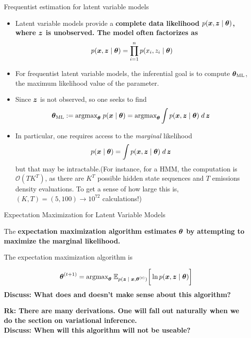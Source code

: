 \documentclass[10pt]{beamer}
\begin{document}
\begin{frame}{Frequentist estimation for latent variable models}
\footnotesize
\begin{itemize}
\item Latent variable models provide a \bf{complete data likelihood}  $p ({\boldsymbol x}, {\boldsymbol z} \; | \; {\boldsymbol \theta})$, where ${\boldsymbol z}$ is unobserved. The model often factorizes as
\[   p ({\boldsymbol x},  {\boldsymbol z} \; | \; {\boldsymbol \theta}) = \displaystyle\prod_{i=1}^n  p (x_i, z_i \; | \; {\boldsymbol \theta}) \]
\item For frequentist latent variable models, the inferential goal is to compute ${\boldsymbol \theta}_{\text{ML}}$, the maximum likelihood value of the parameter.  
\pause
\item Since ${\boldsymbol z}$ is not observed, so one seeks to find 
\begin{equation}
{\boldsymbol \theta}_{\text{ML}}:=  \text{argmax}_{{\boldsymbol \theta}} \; p ({\boldsymbol x} \; | \; {\boldsymbol \theta}) = \text{argmax}_{{\boldsymbol \theta}} \displaystyle\int p({\boldsymbol x},{\boldsymbol z} \; | \; {\boldsymbol \theta}) \; d \,{{\boldsymbol z}} \; 
\label{ml_latent_vars}
\end{equation}
\item In particular, one requires access to the \textit{marginal} likelihood
\begin{equation}
p({\boldsymbol x} \; | \; {\boldsymbol \theta}) = \displaystyle\int p({\boldsymbol x},{\boldsymbol z} \; | \; {\boldsymbol \theta}) \; d \,{{\boldsymbol z}} \; 
\label{marginal_likelihood}
\end{equation}
but that may be intractable.\pause \tiny (For instance, for a HMM, the computation is $\mathcal{O}(T K^T)$, as there are $K^T$ possible hidden state sequences and $T$ emissions density evaluations.  To get a sense of how large this is, $(K,T) = (5,100) \to  10^{72}$ calculations!)
\end{itemize}
\end{frame}






\begin{frame}{Expectation Maximization for Latent Variable Models}

The \bf{expectation maximization algorithm} estimates ${\boldsymbol \theta}$ by attempting to maximize the marginal likelihood. 

The expectation maximization algorithm is 

\begin{equation}
\label{eqn:em_algorithm_appendix}
 {\boldsymbol \theta}^{(t+1)} =  \text{argmax}_{{\boldsymbol \theta}} \; \mathbb{E}_{p({\boldsymbol z} \; | \; {\boldsymbol x} , {\boldsymbol \theta}^{(t)})} \bigg[ \ln p({\boldsymbol x}, {\boldsymbol z} \; | \; {\boldsymbol \theta}) \bigg] 
 \end{equation}
 \vfill
\tiny \bf{Discuss:} What does and doesn't make sense about this algorithm? \\ %
\pause 

\tiny \bf{Rk:}  There are many derivations.  One will fall out naturally when we do the section on variational inference. \\

\pause 
\bf{Discuss:} When will this algorithm will not be useable?

\end{frame}
\end{document}
